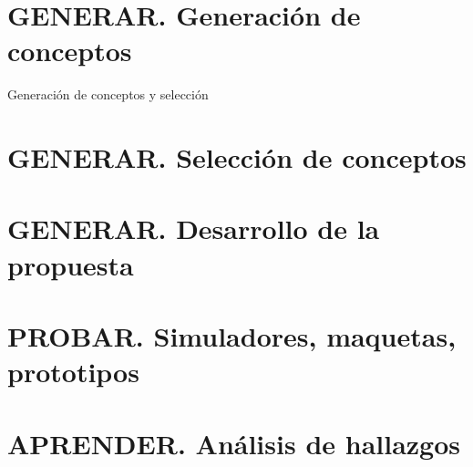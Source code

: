 \section{GENERAR. Generación de conceptos}
Generación de conceptos y selección
\section{GENERAR. Selección de conceptos}
\section{GENERAR. Desarrollo de la propuesta}
\section{PROBAR. Simuladores, maquetas, prototipos}

\section{APRENDER. Análisis de hallazgos}
